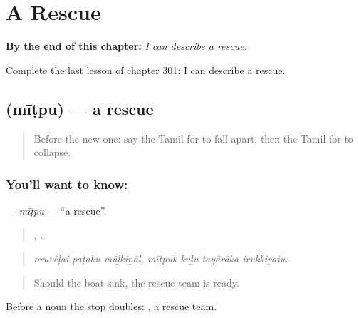 
\chapter{A Rescue}
\label{ch:ta-a-rescue}

\begin{chapteropening}
\textbf{By the end of this chapter:} \emph{I can describe a rescue.}

Complete the last lesson of chapter 301: I can describe a rescue.
\end{chapteropening}

\section[\texorpdfstring{\ta{மீட்பு} (mīṭpu)}{மீட்பு (mīṭpu)}]{ (mīṭpu) — a rescue}

\label{lesson:TA-C301-mitpu}



\begin{quote}
Before the new one: say the Tamil for to fall apart, then the Tamil for to collapse.
\end{quote}

\subsection*{You'll want to know: }
\textbf{} — \emph{mīṭpu} — \textquotedblleft{}a rescue\textquotedblright{}.

\begin{quote}
  ,    .
\end{quote}

\begin{quote}
\emph{oruvēḷai paṭaku mūḻkiṉāl, mīṭpuk kuḻu tayārāka irukkiṟatu.}
\end{quote}

\begin{quote}
Should the boat sink, the rescue team is ready.
\end{quote}

Before a noun the stop doubles:  , a rescue team.


